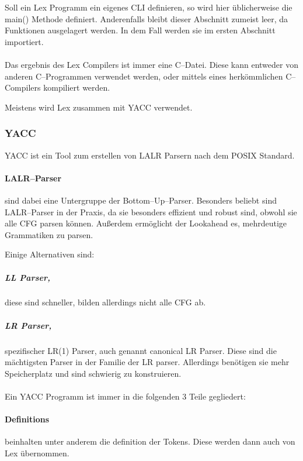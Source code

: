 Soll ein Lex Programm ein eigenes \ac{CLI} definieren, so wird hier üblicherweise die {\ttfamily main()} Methode definiert.
Anderenfalls bleibt dieser Abschnitt zumeist leer, da Funktionen ausgelagert werden.
In dem Fall werden sie im ersten Abschnitt importiert.

\paragraph*{}
Das ergebnis des Lex Compilers ist immer eine C--Datei.
Diese kann entweder von anderen C--Programmen verwendet werden, oder mittels eines herkömmlichen C--Compilers kompiliert werden.

Meistens wird Lex zusammen mit \ac{YACC} verwendet.

\subsubsection{\acs{YACC}}
\ac{YACC} ist ein Tool zum erstellen von \ac{LALR} Parsern nach dem \ac{POSIX} Standard.

\paragraph{\acs{LALR}--Parser} sind dabei eine Untergruppe der Bottom--Up--Parser.
Besonders beliebt sind \acs{LALR}--Parser in der Praxis, da sie besonders effizient und robust sind, obwohl sie alle \ac{CFG} parsen können.
Außerdem ermöglicht der Lookahead es, mehrdeutige Grammatiken zu parsen.

Einige Alternativen sind:

\subparagraph{\ac{LL} Parser,} diese sind schneller, bilden allerdings nicht alle \ac{CFG} ab.

\subparagraph{\ac{LR} Parser,} spezifischer LR(1) Parser, auch genannt canonical \acs{LR} Parser.
Diese sind die mächtigsten Parser in der Familie der \ac{LR} parser.
Allerdings benötigen sie mehr Speicherplatz und sind schwierig zu konstruieren.

\paragraph*{}
Ein \ac{YACC} Programm ist immer in die folgenden 3 Teile gegliedert:


\paragraph{Definitions} beinhalten unter anderem die definition der Tokens.
Diese werden dann auch von Lex übernommen.

